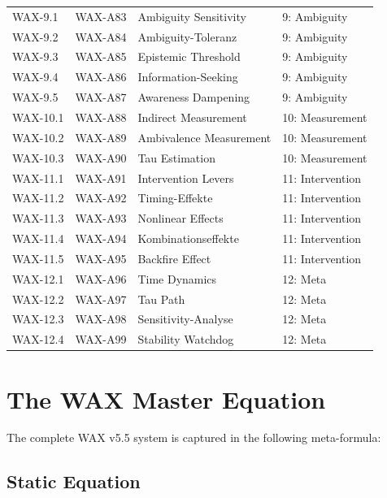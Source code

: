 \begin{longtable}{@{}llll@{}}
WAX-9.1 & WAX-A83 & Ambiguity Sensitivity & 9: Ambiguity \\
WAX-9.2 & WAX-A84 & Ambiguity-Toleranz & 9: Ambiguity \\
WAX-9.3 & WAX-A85 & Epistemic Threshold & 9: Ambiguity \\
WAX-9.4 & WAX-A86 & Information-Seeking & 9: Ambiguity \\
WAX-9.5 & WAX-A87 & Awareness Dampening & 9: Ambiguity \\
\midrule

WAX-10.1 & WAX-A88 & Indirect Measurement & 10: Measurement \\
WAX-10.2 & WAX-A89 & Ambivalence Measurement & 10: Measurement \\
WAX-10.3 & WAX-A90 & Tau Estimation & 10: Measurement \\
\midrule

WAX-11.1 & WAX-A91 & Intervention Levers & 11: Intervention \\
WAX-11.2 & WAX-A92 & Timing-Effekte & 11: Intervention \\
WAX-11.3 & WAX-A93 & Nonlinear Effects & 11: Intervention \\
WAX-11.4 & WAX-A94 & Kombinationseffekte & 11: Intervention \\
WAX-11.5 & WAX-A95 & Backfire Effect & 11: Intervention \\
\midrule

WAX-12.1 & WAX-A96 & Time Dynamics & 12: Meta \\
WAX-12.2 & WAX-A97 & Tau Path & 12: Meta \\
WAX-12.3 & WAX-A98 & Sensitivity-Analyse & 12: Meta \\
WAX-12.4 & WAX-A99 & Stability Watchdog & 12: Meta \\

\end{longtable}

\section{The WAX Master Equation}
\label{sec:av-master-equation}

The complete WAX v5.5 system is captured in the following meta-formula:

\subsection{Static Equation}


